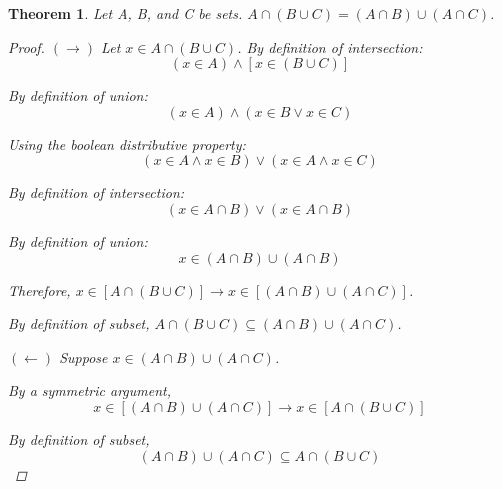 \documentclass{article}
\newtheorem{theorem}{Theorem}
\numberwithin{subcase}{case}
\begin{document}
\begin{outline}[enumerate]
    \1 \begin{theorem}
        Let A, B, and C be sets. $A \cap (B \cup C) = (A \cap B) \cup (A \cap C)$.
        \begin{proof}
            $(\rightarrow)$ Let $x \in A \cap (B \cup C)$. By definition of intersection: 
            \begin{equation}
                (x \in A) \wedge [x \in (B \cup C)]
            \end{equation}

            By definition of union: 
            \begin{equation}
                (x \in A) \wedge (x \in B \vee x \in C)
            \end{equation}

            Using the boolean distributive property: 
            \begin{equation}
                (x \in A \wedge x \in B) \vee (x \in A \wedge x \in C)
            \end{equation}

            By definition of intersection: 
            \begin{equation}
                (x \in A \cap B) \vee (x \in A \cap B)
            \end{equation}

            By definition of union:
            \begin{equation}
                x \in (A \cap B) \cup (A \cap B)
            \end{equation}

            Therefore, $x \in [A \cap (B \cup C)] \rightarrow x \in [(A \cap B) \cup (A \cap C)]$.

            By definition of subset, $A \cap (B \cup C) \subseteq (A \cap B) \cup (A \cap C)$.

            $(\leftarrow)$ Suppose $x \in (A \cap B) \cup (A \cap C)$. 
            
            By a symmetric argument,
            \begin{equation}
                x \in [(A \cap B) \cup (A \cap C)] \rightarrow x \in [A \cap (B \cup C)]  
            \end{equation}
            
            By definition of subset, 
            \begin{equation}
                (A \cap B) \cup (A \cap C) \subseteq A \cap (B \cup C)
            \end{equation}


\end{proof}
\end{theorem}
\end{outline}
\end{document}
